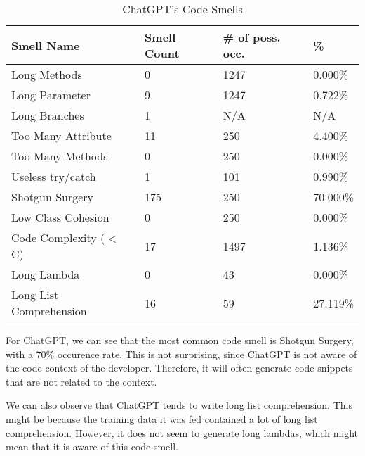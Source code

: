 \begin{table}[!ht]
    \centering
    \caption{ChatGPT's Code Smells}
    \begin{tabular}{llll}
        \hline
        \textbf{Smell Name}     & \textbf{Smell Count} & \textbf{\# of poss. occ.} & \textbf{\%} \\ \hline
        Long Methods            & 0                    & 1247                      & 0.000\%     \\
        Long Parameter          & 9                    & 1247                      & 0.722\%     \\
        Long Branches           & 1                    & N/A                       & N/A         \\
        Too Many Attribute      & 11                   & 250                       & 4.400\%     \\
        Too Many Methods        & 0                    & 250                       & 0.000\%     \\
        Useless try/catch       & 1                    & 101                       & 0.990\%     \\
        Shotgun Surgery         & 175                  & 250                       & 70.000\%    \\
        Low Class Cohesion      & 0                    & 250                       & 0.000\%     \\
        Code Complexity ($<$ C) & 17                   & 1497                      & 1.136\%     \\
        Long Lambda             & 0                    & 43                        & 0.000\%     \\
        Long List Comprehension & 16                   & 59                        & 27.119\%    \\ \hline
    \end{tabular}
    \label{table:result-chatgpt}
\end{table}
\FloatBarrier

For ChatGPT, we can see that the most common code smell is Shotgun Surgery, with a 70\% occurence rate. This is not surprising, since ChatGPT is not aware of the code context of the developer. Therefore, it will often generate code snippets that are not related to the context.

We can also observe that ChatGPT tends to write long list comprehension. This might be because the training data it was fed contained a lot of long list comprehension. However, it does not seem to generate long lambdas, which might mean that it is aware of this code smell.

